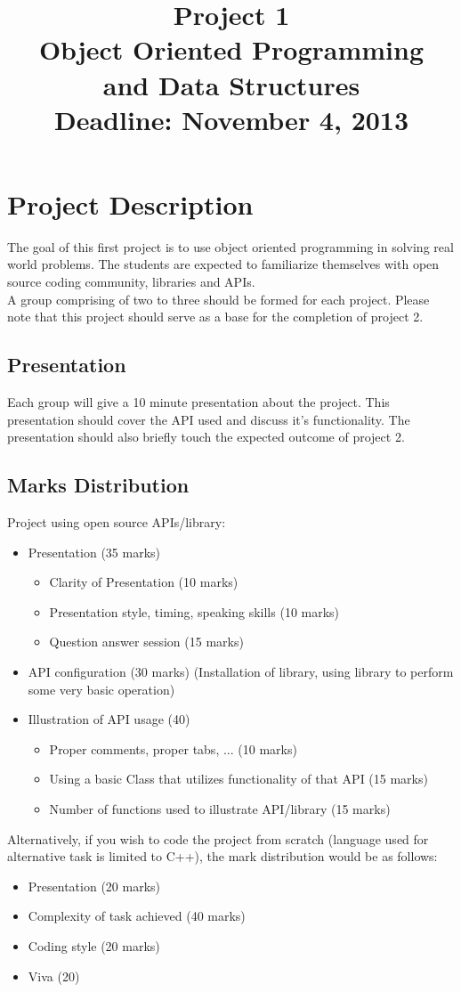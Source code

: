\documentclass[11pt]{article}
\title{\textbf{Project 1}\\ Object Oriented Programming\\ and Data Structures \\\textbf{Deadline:} November 4, 2013 }
\date{}
\begin{document}
\maketitle
\newpage

\section*{Project Description}
The goal of this first project is to use object oriented programming
in solving real world problems. The students are expected to
familiarize themselves with open source coding community, libraries
and APIs. \\ A group comprising of two to three should be formed for each project.
 Please note that this project should serve as a
base for the completion of project 2.

\subsection*{Presentation}
Each group will give a 10 minute presentation about the project. This
presentation should cover the API used and discuss it's
functionality. The presentation should also briefly touch the expected outcome of project 2.

\subsection*{Marks Distribution}
Project using open source APIs/library:
\begin{itemize}
\item Presentation (35 marks)
  \begin{itemize}
  \item Clarity of Presentation (10 marks)
  \item Presentation style, timing, speaking skills  (10 marks)
  \item Question answer session (15 marks)
  \end{itemize}
\item API configuration (30 marks) (Installation of library, using library to perform some very basic operation)
\item Illustration of API usage (40)
  \begin{itemize}
  \item Proper comments, proper tabs, ... (10 marks)
  \item Using a basic Class that utilizes functionality of that API (15 marks)
  \item Number of functions used to illustrate API/library (15 marks)
  \end{itemize}
\end{itemize}
Alternatively, if you wish to code the project from scratch (language used for alternative task is limited to C++), the mark distribution would be as follows:
\begin{itemize}
\item Presentation (20 marks)
\item Complexity of task achieved (40 marks)
\item Coding style (20 marks) 
\item Viva (20) 
\end{itemize}
\end{document}
